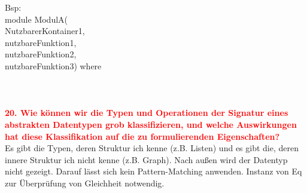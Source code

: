 \documentclass{article}
\begin{document}
Bsp:\\
module ModulA(\\
NutzbarerKontainer1,\\
nutzbareFunktion1,\\
nutzbareFunktion2,\\
nutzbareFunktion3) where\\
\\
\\
\\
    \textcolor{red}{\textbf{20. Wie können wir die Typen und Operationen der Signatur eines abstrakten Datentypen grob klassifizieren, und welche Auswirkungen hat diese Klassifikation auf die zu formulierenden Eigenschaften?}}
\\
Es gibt die Typen, deren Struktur ich kenne (z.B. Listen) und es gibt die, deren innere Struktur ich nicht kenne (z.B. Graph). Nach außen wird der Datentyp nicht gezeigt. Darauf lässt sich kein Pattern-Matching anwenden. Instanz von Eq zur Überprüfung von Gleichheit notwendig.
\end{document}
